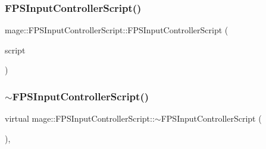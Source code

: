 \hypertarget{classmage_1_1_f_p_s_input_controller_script_acab23879d93819b2d4ccf98c16403c36}{}\label{classmage_1_1_f_p_s_input_controller_script_acab23879d93819b2d4ccf98c16403c36} 
\subsubsection{\texorpdfstring{F\+P\+S\+Input\+Controller\+Script()}{FPSInputControllerScript()}\hspace{0.1cm}{\footnotesize\ttfamily [3/3]}}
{\footnotesize\ttfamily mage\+::\+F\+P\+S\+Input\+Controller\+Script\+::\+F\+P\+S\+Input\+Controller\+Script (\begin{DoxyParamCaption}\item[{\hyperlink{classmage_1_1_f_p_s_input_controller_script}{F\+P\+S\+Input\+Controller\+Script} \&\&}]{script }\end{DoxyParamCaption})\hspace{0.3cm}{\ttfamily [default]}}

\hypertarget{classmage_1_1_f_p_s_input_controller_script_af01f839ac9e214003de70732988de247}{}\label{classmage_1_1_f_p_s_input_controller_script_af01f839ac9e214003de70732988de247} 
\subsubsection{\texorpdfstring{$\sim$\+F\+P\+S\+Input\+Controller\+Script()}{~FPSInputControllerScript()}}
{\footnotesize\ttfamily virtual mage\+::\+F\+P\+S\+Input\+Controller\+Script\+::$\sim$\+F\+P\+S\+Input\+Controller\+Script (\begin{DoxyParamCaption}{ }\end{DoxyParamCaption})\hspace{0.3cm}{\ttfamily [virtual]}, {\ttfamily [default]}}




